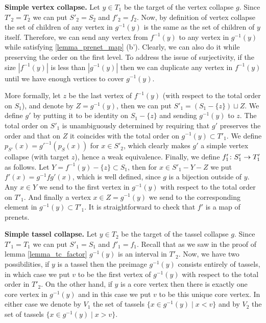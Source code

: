 \documentclass[letterpaper,12pt,leqno]{article}
\numberwithin{equation}{theorem}
\begin{document}
{\bf Simple vertex collapse.} Let $y \in T_1$ be the target of the vertex collapse $g$. Since $T'_2 = T_2$ we can put $S'_2 = S_2$ and $f'_2 = f_2$. Now, by definition
of vertex collapse the set of children of any vertex in $g^{-1}(y)$ is the same as the set of children of $y$ itself. Therefore, we can send any vertex from $f^{-1}(y)$
to any vertex in $g^{-1}(y)$ while satisfying \ref{lemma_prenet_map} (b'). Clearly, we can also do it while preserving the order on the first level. To address the issue of
surjectivity, if the size $|f^{-1}(y)|$ is less than $|g^{-1}(y)|$ then we can duplicate any vertex in $f^{-1}(y)$ until we have enough vertices to cover
$g^{-1}(y)$.

More formally, let $z$ be the last vertex of $f^{-1}(y)$ (with respect to the total order on $S_1$), and denote by $Z = g^{-1}(y)$, then we can put $S'_1 = (S_1 - \{z\}) \sqcup Z$.
We define $g'$ by putting it to be identity on $S_1 - \{z\}$ and sending $g^{-1}(y)$ to $z$. The total order on $S'_1$ is unambiguously determined by requiring
that $g'$ preserves the order and that on $Z$ it coincides with the total order on $g^{-1}(y) \subset T'_1$. We define $p_{S'}(x) = g'^{-1}(p_S(x))$ for $x \in S'_2$, which clearly makes
$g'$ a simple vertex collapse (with target $z$), hence a weak equivalence. Finally, we define $f'_1\colon S'_1 \to T'_1$ as follows. Let $Y = f^{-1}(y) - \{z\} \subset S_1$,
then for $x \in S'_1 - Y - Z$ we put $f'(x) = g^{-1}fg'(x)$, which is well defined, since $g$ is a bijection outside of $y$. Any $x \in Y$ we send to the first vertex in $g^{-1}(y)$ with
respect to the total order on $T'_1$. And finally a vertex $x \in Z = g^{-1}(y)$ we send to the corresponding element in $g^{-1}(y) \subset T'_1$. It is straightforward to check
that $f'$ is a map of prenets.

{\bf Simple tassel collapse.} Let $y \in T_2$ be the target of the tassel collapse $g$. Since $T'_1 = T_1$ we can put $S'_1 = S_1$ and $f'_1 = f_1$.
Recall that as we saw in the proof of lemma \ref{lemma_tc_factor} $g^{-1}(y)$ is an interval in $T'_2$. Now, we have two possibilities,
if $y$ is a tassel then the preimage $g^{-1}(y)$ consists entirely of tassels, in which case we put $v$ to be the first vertex of $g^{-1}(y)$ with respect to the total order in $T'_2$.
On the other hand, if $y$ is a core vertex then there is exactly one core vertex in $g^{-1}(y)$ and in this case we put $v$ to be this unique core vertex. In either case we
denote by $V_1$ the set of tassels $\{x \in g^{-1}(y) \mid x < v\}$ and by $V_2$ the set of tassels $\{x \in g^{-1}(y) \mid x > v\}$.
\end{document}

